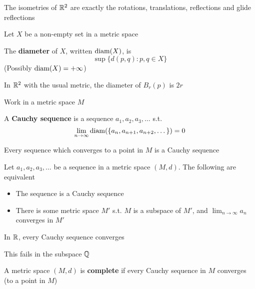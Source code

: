 \documentclass[11pt]{article}
\begin{document}
\begin{proposition}[]
The isometries of \(\mathbb{R}^2\) are exactly the rotations, translations, reflections and glide reflections
\end{proposition}

Let \(X\) be a non-empty set in a metric space

\begin{definition}[]
The \textbf{diameter} of \(X\), written \(\operatorname{diam}(X)\), is
\begin{equation*}
\sup\{d(p,q):p,q\in X\}
\end{equation*}
(Possibly \(\operatorname{diam}(X)=+\infty\))
\end{definition}

\begin{examplle}[]
In \(\mathbb{R}^2\) with the usual metric, the diameter of \(B_r(p)\) is \(2r\)
\end{examplle}

Work in a metric space \(M\)
\begin{definition}[]
A \textbf{Cauchy sequence} is a sequence \(a_1,a_2,a_3,\dots\) s.t.
\begin{equation*}
\lim_{n\to\infty}\operatorname{diam}(\{a_n,a_{n+1},a_{n+2},\dots\})=0
\end{equation*}
\end{definition}

\begin{proposition}[]
Every sequence which converges to a point in \(M\) is a Cauchy sequence
\end{proposition}

\begin{proposition}[]
Let \(a_1,a_2,a_3,\dots\) be a sequence in a metric space \((M,d)\). The following are equivalent
\begin{itemize}
\item The sequence is a Cauchy sequence
\item There is some metric space \(M'\) s.t. \(M\) is a subspace of \(M'\), and \(\lim_{n\to\infty}a_n\)
converges in \(M'\)
\end{itemize}
\end{proposition}

\begin{proposition}[]
In \(\mathbb{R}\), every Cauchy sequence converges
\end{proposition}

This fails in the subspace \(\mathbb{Q}\)

\begin{definition}[]
A metric space \((M,d)\) is \textbf{complete} if every Cauchy sequence in \(M\) converges (to a point in \(M\))
\end{definition}
\end{document}
